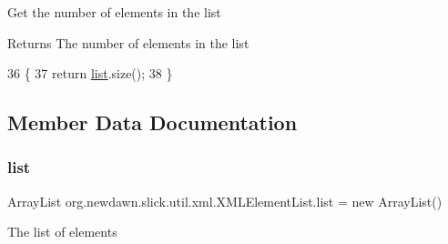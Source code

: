Get the number of elements in the list

\begin{DoxyReturn}{Returns}
The number of elements in the list 
\end{DoxyReturn}

\begin{DoxyCode}
36                       \{
37         \textcolor{keywordflow}{return} \mbox{\hyperlink{classorg_1_1newdawn_1_1slick_1_1util_1_1xml_1_1_x_m_l_element_list_ade4a37ed92cf6392dbea3cdc9d9e6a6f}{list}}.size();
38     \}
\end{DoxyCode}


\subsection{Member Data Documentation}
\mbox{\label{classorg_1_1newdawn_1_1slick_1_1util_1_1xml_1_1_x_m_l_element_list_ade4a37ed92cf6392dbea3cdc9d9e6a6f}} 
\subsubsection{\texorpdfstring{list}{list}}
{\footnotesize\ttfamily Array\+List org.\+newdawn.\+slick.\+util.\+xml.\+X\+M\+L\+Element\+List.\+list = new Array\+List()\hspace{0.3cm}{\ttfamily [private]}}

The list of elements 